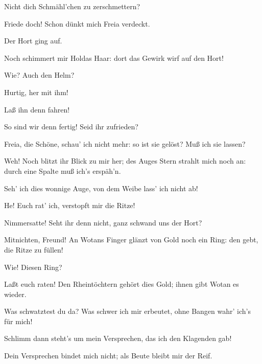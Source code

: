 \begin{drama}
\Donnerspeaks


Nicht dich Schmähl'chen zu zerschmettern?
 

\Wotanspeaks
Friede doch!
Schon dünkt mich Freia verdeckt.
 

\Logespeaks
Der Hort ging auf.
 

\Fafnerspeaks


Noch schimmert mir Holdas Haar:
dort das Gewirk wirf auf den Hort!
 

\Logespeaks
Wie? Auch den Helm?
 

\Fafnerspeaks
Hurtig, her mit ihm!
 

\Wotanspeaks
Laß ihn denn fahren!
 

\Logespeaks


So sind wir denn fertig!
Seid ihr zufrieden?
 

\Fasoltspeaks
Freia, die Schöne, schau' ich nicht mehr:
so ist sie gelöst? Muß ich sie lassen?
 



Weh! Noch blitzt ihr Blick zu mir her;
des Auges Stern strahlt mich noch an:
durch eine Spalte muß ich's erspäh'n.
 



Seh' ich dies wonnige Auge,
von dem Weibe lass' ich nicht ab!
 

\Fafnerspeaks
He! Euch rat' ich,
verstopft mir die Ritze!
 

\Logespeaks
Nimmersatte! Seht ihr denn nicht,
ganz schwand uns der Hort?
 

\Fafnerspeaks
Mitnichten, Freund! An Wotans Finger
glänzt von Gold noch ein Ring:
den gebt, die Ritze zu füllen!
 

\Wotanspeaks
Wie! Diesen Ring?
 

\Logespeaks
Laßt euch raten!
Den Rheintöchtern gehört dies Gold;
ihnen gibt Wotan es wieder.
 

\Wotanspeaks
Was schwatztest du da?
Was schwer ich mir erbeutet,
ohne Bangen wahr' ich's für mich!
 

\Logespeaks
Schlimm dann steht's um mein Versprechen,
das ich den Klagenden gab!
 

\Wotanspeaks
Dein Versprechen bindet mich nicht;
als Beute bleibt mir der Reif.
 


\end{drama}
